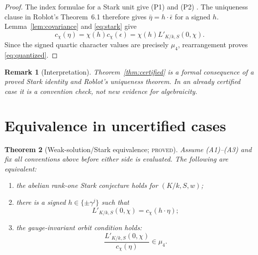 \documentclass[11pt]{article}
\newtheorem{theorem}{Theorem}
\newtheorem{remark}[theorem]{Remark}
\newcommand{\Lprime}{L'_{K/k,S}}
\begin{document}
\begin{proof}
The index formulae for a Stark unit give (P1) and (P2)
\cite[Thm.~2.3]{Roblot2013}.  The uniqueness clause in Roblot's
Theorem~6.1 therefore gives
\(\bar\eta=h\mathbin{\cdot}\bar\epsilon\) for a signed \(h\).
Lemma~\ref{lem:covariance} and \eqref{eq:stark} give
\[
c_\chi(\eta)
=\chi(h)c_\chi(\epsilon)
=\chi(h)\Lprime(0,\chi).
\]
Since the signed quartic character values are precisely \(\mu_4\),
rearrangement proves \eqref{eq:quantized}.
\end{proof}

\begin{remark}[Interpretation]
Theorem~\ref{thm:certified} is a formal consequence of a proved Stark
identity and Roblot's uniqueness theorem.  In an already certified
case it is a convention check, not new evidence for algebraicity.
\end{remark}

\section{Equivalence in uncertified cases}

\begin{theorem}[Weak-solution/Stark equivalence; \textsc{proved}]
\label{thm:equivalence}
Assume \emph{(A1)--(A3)} and fix all conventions above before either
side is evaluated.  The following are equivalent:
\begin{enumerate}
\item the abelian rank-one Stark conjecture holds for \((K/k,S,w)\);
\item there is a signed \(h\in\{\pm\gamma^j\}\) such that
  \[
  \Lprime(0,\chi)=c_\chi(h\mathbin{\cdot}\eta);
  \tag{8}\label{eq:one-character}
  \]
\item the gauge-invariant orbit condition holds:
  \[
  \frac{\Lprime(0,\chi)}{c_\chi(\eta)}\in\mu_4.
  \tag{9}\label{eq:orbit}
  \]
\end{enumerate}
\end{theorem}
\end{document}
